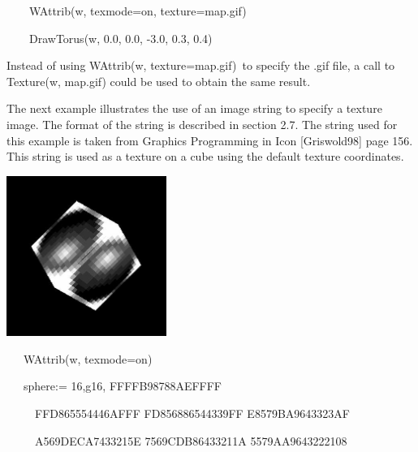 \documentclass[letterpaper]{article}
\begin{document}
\bigskip

{\ttfamily
\textsf{\ \ \ \ }\textsf{WAttrib(w, {\textquotedbl}texmode=on{\textquotedbl},
{\textquotedbl}texture=map.gif{\textquotedbl})}}

{\sffamily
\ \ \ \ DrawTorus(w, 0.0, 0.0, -3.0, 0.3, 0.4) }


\bigskip

{
Instead of using \textsf{WAttrib(w, {\textquotedbl}texture=map.gif{\textquotedbl})}\texttt{ }to specify the .gif file, a
call to \textsf{Texture(w, {\textquotedbl}map.gif{\textquotedbl})} could be used to obtain the same result.}


\bigskip

{
The next example illustrates the use of an image string to specify a texture image. The format of the string is
described in section 2.7. The string used for this example is taken from Graphics Programming in Icon [Griswold98] page
156. This string is used as a texture on a cube using the default texture coordinates. }


\bigskip

{\centering  \includegraphics[width=2.0508in,height=2.0571in]{utr9/utr9-img027.jpg} \par}

\bigskip

{\sffamily
\ \ \ WAttrib(w, {\textquotedbl}texmode=on{\textquotedbl})}

{\sffamily
\ \ \ sphere:= {\textquotedbl}16,g16, FFFFB98788AEFFFF{\textquotedbl} {\textbar}{\textbar}}

{\sffamily
\ \ \ \ \ {\textquotedbl}FFD865554446AFFF FD856886544339FF E8579BA9643323AF{\textquotedbl}{\textbar}{\textbar}}

{\sffamily
\ \ \ \ \ {\textquotedbl}A569DECA7433215E 7569CDB86433211A 5579AA9643222108{\textquotedbl}{\textbar}{\textbar}}
\end{document}
